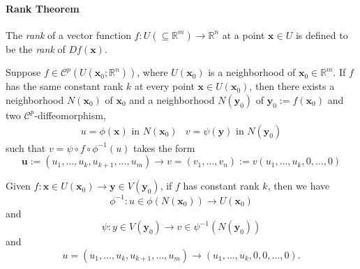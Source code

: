 \paragraph{Rank Theorem}
\begin{definition}[Rank]
The \emph{rank} of a vector function $f:U(\subseteq\mathbb{R}^m)\to\mathbb{R}^n$ at a point $\bm x\in U$ is defined to be the \textit{rank} of $Df(\bm x)$.
\end{definition}
%
\begin{theorem}
Suppose $f\in\mathcal{C}^p(U(\bm x_0;\mathbb{R}^n))$, where $U(\bm x_0)$ is a neighborhood of $\bm x_0\in\mathbb{R}^m$. If $f$ has the same constant rank $k$ at every point $\bm x\in U(\bm x_0)$, then there exists a neighborhood $N(\bm x_0)$ of $\bm x_0$ and a neighborhood $N(\bm y_0)$ of $\bm y_0:=f(\bm x_0)$ and two $\mathcal{C}^p$-diffeomorphism,
\[
\begin{array}{ll}
\mbox{$u=\phi(\bm x)$ in $N(\bm x_0)$}
&
\mbox{$v=\psi(\bm y)$ in $N(\bm y_0)$}
\end{array}
\]
such that $v = \psi\circ f\circ\phi^{-1}(u)$ takes the form
\[
\bm u:=(u_1,\dots,u_k,u_{k+1},\dots,u_m)\to
v=(v_1,\dots,v_n):=v(u_1,\dots,u_k,0,\dots,0)
\]

\end{theorem}
\begin{remark}
Given $f:\bm x\in U(\bm x_0)\to \bm y\in V(\bm y_0)$, if $f$ has constant rank $k$, then we have
\[
\phi^{-1}:u\in \phi(N(\bm x_0))\to U(\bm x_0)
\]
and
\[
\psi: y\in V(\bm y_0)\to v\in \psi^{-1}(N(\bm y_0))
\]
and
\[
u=(u_1,\dots,u_k,u_{k+1},\dots,u_m)\to
(u_1,\dots,u_k,0,0,\dots,0).
\]
\end{remark}

